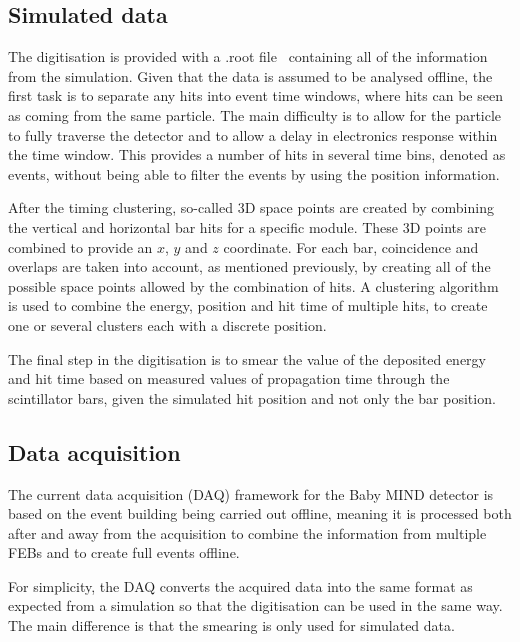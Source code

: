 \subsection{Simulated data}

The digitisation is provided with a .root file~\cite{Root} containing all of the information from the simulation. Given that the data is assumed to be analysed offline, the first task is to separate any hits into event time windows, where hits can be seen as coming from the same particle. The main difficulty is to allow for the particle to fully traverse the detector and to allow a delay in electronics response within the time window. This provides a number of hits in several time bins, denoted as events, without being able to filter the events by using the position information.

After the timing clustering, so-called 3D space points are created by combining the vertical and horizontal bar hits for a specific module. These 3D points are combined to provide an $x$, $y$ and $z$ coordinate. For each bar, coincidence and overlaps are taken into account, as mentioned previously, by creating all of the possible space points allowed by the combination of hits. A clustering algorithm is used to combine the energy, position and hit time of multiple hits, to create one or several clusters each with a discrete position.%

The final step in the digitisation is to smear the value of the deposited energy and hit time based on measured values of propagation time through the scintillator bars, given the simulated hit position and not only the bar position.

\subsection{Data acquisition}

The current data acquisition (DAQ) framework for the Baby MIND detector is based on the event building being carried out offline,  meaning it is processed both after and away from the acquisition to combine the information from multiple FEBs and to create full events offline.

For simplicity, the DAQ converts the acquired data into the same format as expected from a simulation so that the digitisation can be used in the same way. The main difference is that the smearing is only used for simulated data.

